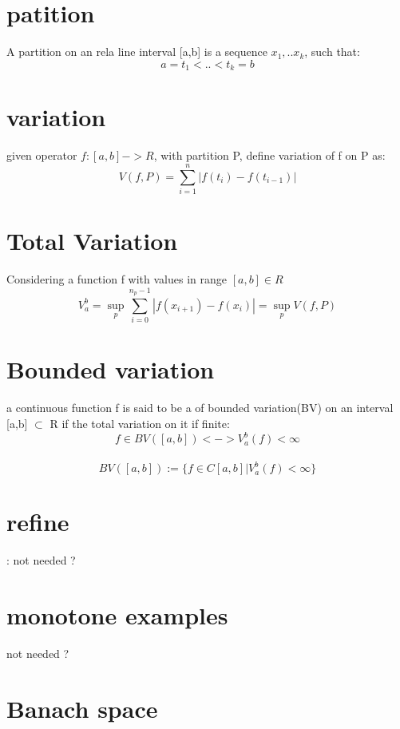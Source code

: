 \documentclass{article}
\title{}
\author{Мартин }
\date{}
\begin{document}
\maketitle

\section{patition}

A partition on an rela line interval [a,b] is a sequence $x_1,..x_{k}$, such that:
$$a=t_{1} < .. < t_{k} = b$$

\section{variation}
given operator $f: [a,b] -> R$, with partition P, define variation of f on P as:
$$V(f, P) = \sum_{i=1}^{n} |f(t_{i})-f(t_{i-1})|$$

\section{Total Variation}
Considering a function f with values in range $[a,b] \in R$
$$V^{b}_{a}=\sup_p \sum_{i=0}^{n_{p}-1} | f(x_{i+1}) - f(x_i) | = \sup_{p} V(f, P)$$

\section{Bounded variation}
a continuous function f is said to be a of bounded variation(BV) on an interval [a,b] $\subset$ R if the total variation on it if finite:
$$f \in BV([a,b]) <-> V_a^b(f) < \infty$$

\paragraph{}
$$BV([a,b]) := \{ f \in C[a,b] | V^{b}_{a}(f) < \infty \}$$
$$$$


\section{refine}:
	not needed ?

\section{monotone examples}
	not needed ?

\section{Banach space}
\end{document}

